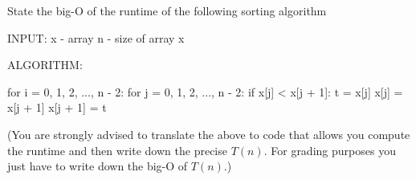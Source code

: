 State the big-O of the runtime of the following sorting algorithm
\begin{console}
INPUT:   x - array
         n - size of array x

ALGORITHM:

for i = 0, 1, 2, ..., n - 2:
    for j = 0, 1, 2, ..., n - 2:
        if x[j] < x[j + 1]:
            t = x[j]
            x[j] = x[j + 1]
            x[j + 1] = t

\end{console}

(You are strongly advised to translate the above to code
that allows you compute the runtime and then  
write down the precise $T(n)$. For grading purposes
you just have to write down the big-O of $T(n)$.)
